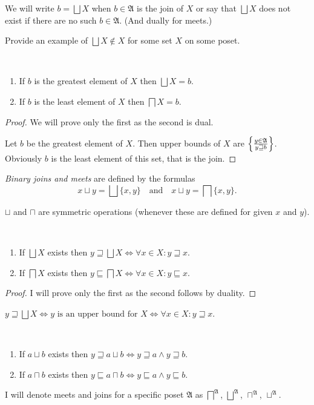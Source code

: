We will write $b=\bigsqcup X$ when $b\in\mathfrak{A}$ is the join
of $X$ or say that $\bigsqcup X$ does not exist if there are no
such $b\in\mathfrak{A}$. (And dually for meets.)
\begin{xca}
Provide an example of $\bigsqcup X\notin X$ for some set $X$ on
some poset.\end{xca}
\begin{prop}
~
\begin{enumerate}
\item If $b$ is the greatest element of $X$ then $\bigsqcup X=b$.
\item If $b$ is the least element of $X$ then $\bigsqcap X=b$.
\end{enumerate}
\end{prop}
\begin{proof}
We will prove only the first as the second is dual.

Let $b$ be the greatest element of $X$. Then upper bounds of $X$
are $\left\{ \frac{y\in\mathfrak{A}}{y\sqsupseteq b}\right\}$. Obviously $b$
is the least element of this set, that is the join.\end{proof}
\begin{defn}
\emph{Binary joins and meets} are defined by the
formulas
\[
x\sqcup y=\bigsqcup\{x,y\}\quad\text{and}\quad x\sqcup y=\bigsqcap\{x,y\}.
\]
\end{defn}
\begin{obvious}
$\sqcup$ and $\sqcap$ are symmetric operations (whenever these are
defined for given $x$ and $y$).\end{obvious}
\begin{thm}
~
\begin{enumerate}
\item If $\bigsqcup X$ exists then $y\sqsupseteq\bigsqcup X\Leftrightarrow\forall x\in X:y\sqsupseteq x$.
\item If $\bigsqcap X$ exists then $y\sqsubseteq\bigsqcap X\Leftrightarrow\forall x\in X:y\sqsubseteq x$.
\end{enumerate}
\end{thm}
\begin{proof}
I will prove only the first as the second follows by duality.
\end{proof}
$y\sqsupseteq\bigsqcup X\Leftrightarrow y\text{ is an upper bound for }X\Leftrightarrow\forall x\in X:y\sqsupseteq x$.
\begin{cor}
~
\begin{enumerate}
\item If $a\sqcup b$ exists then $y\sqsupseteq a\sqcup b\Leftrightarrow y\sqsupseteq a\land y\sqsupseteq b$.
\item If $a\sqcap b$ exists then $y\sqsubseteq a\sqcap b\Leftrightarrow y\sqsubseteq a\land y\sqsubseteq b$.
\end{enumerate}
\end{cor}
I will denote meets and joins for a specific poset $\mathfrak{A}$
as $\bigsqcap^{\mathfrak{A}}$, $\bigsqcup^{\mathfrak{A}}$, $\sqcap^{\mathfrak{A}}$,
$\sqcup^{\mathfrak{A}}$.


